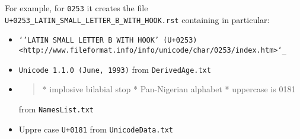 \documentclass[12]{mwart}
\begin{document}
For example, for \texttt{0253} it creates the file
\texttt{U+0253_LATIN_SMALL_LETTER_B_WITH_HOOK.rst} containing in
particular:

\begin{itemize}
\item \texttt{`'LATIN SMALL LETTER B WITH HOOK' (U+0253) <http://www.fileformat.info/info/unicode/char/0253/index.htm>`_
}
\item \texttt{Unicode 1.1.0 (June, 1993)}
from \texttt{DerivedAge.txt}
\item 
  \begin{quote}
    \obeylines
    	* implosive bilabial stop
	* Pan-Nigerian alphabet
	* uppercase is 0181
  \end{quote}
from \texttt{NamesList.txt}
\item Uppre case \texttt{U+0181} from \texttt{UnicodeData.txt}
\end{itemize}
\end{document}
